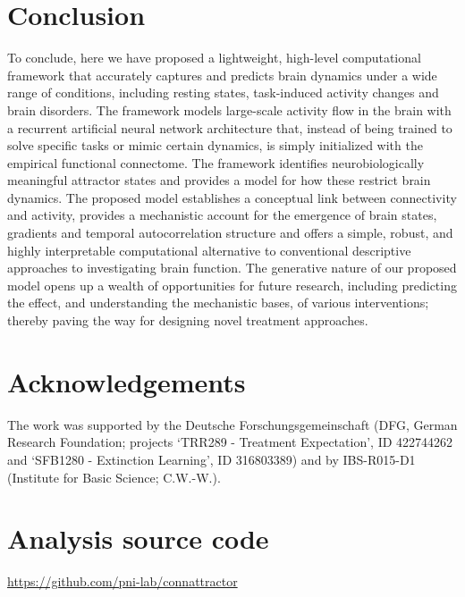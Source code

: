\documentclass{article}
\begin{document}
\section{Conclusion}

To conclude, here we have proposed a lightweight, high-level computational framework that accurately captures and predicts brain dynamics under a wide range of conditions, including resting states, task-induced activity changes and brain disorders. The framework models large-scale activity flow in the brain with a recurrent artificial neural network architecture that, instead of being trained to solve specific tasks or mimic certain dynamics, is simply initialized with the empirical functional connectome. The framework identifies neurobiologically meaningful attractor states and provides a model for how these restrict brain dynamics.
The proposed model establishes a conceptual link between connectivity and activity, provides a mechanistic account for the emergence of brain states, gradients and temporal autocorrelation structure and offers a simple, robust, and highly interpretable computational alternative to conventional descriptive approaches to investigating brain function. The generative nature of our proposed model opens up a wealth of opportunities for future research, including predicting the effect, and understanding the mechanistic bases, of various interventions; thereby paving the way for designing novel treatment approaches.


\section{Acknowledgements}

The work was supported by the Deutsche Forschungsgemeinschaft (DFG, German Research Foundation; projects `TRR289 - Treatment Expectation', ID 422744262 and `SFB1280 - Extinction Learning', ID 316803389) and by IBS-R015-D1 (Institute for Basic Science; C.W.-W.).



\section{Analysis source code}

\href{https://github.com/pni-lab/connattractor}{https://github.com/pni-lab/connattractor}
\end{document}

